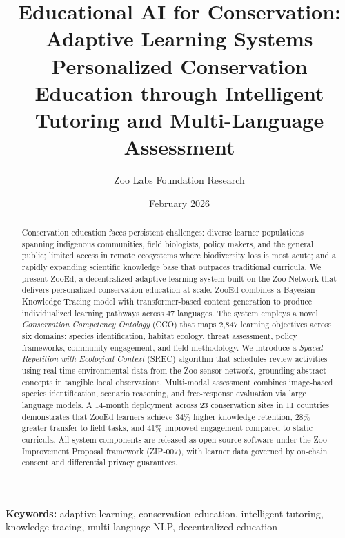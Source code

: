 \documentclass[11pt,a4paper]{article}
\title{\textbf{Educational AI for Conservation: Adaptive Learning Systems} \\[0.5em]
\large Personalized Conservation Education through Intelligent Tutoring and Multi-Language Assessment}
\author[1]{Zoo Labs Foundation Research}
\affil[1]{Zoo Labs Foundation, Research Division \\ \texttt{research@zoo.ngo}}
\date{February 2026}
\begin{document}
\maketitle

\begin{abstract}
\noindent
Conservation education faces persistent challenges: diverse learner populations spanning indigenous communities, field biologists, policy makers, and the general public; limited access in remote ecosystems where biodiversity loss is most acute; and a rapidly expanding scientific knowledge base that outpaces traditional curricula.
We present ZooEd, a decentralized adaptive learning system built on the Zoo Network that delivers personalized conservation education at scale.
ZooEd combines a Bayesian Knowledge Tracing model with transformer-based content generation to produce individualized learning pathways across 47 languages.
The system employs a novel \emph{Conservation Competency Ontology} (CCO) that maps 2,847 learning objectives across six domains: species identification, habitat ecology, threat assessment, policy frameworks, community engagement, and field methodology.
We introduce a \emph{Spaced Repetition with Ecological Context} (SREC) algorithm that schedules review activities using real-time environmental data from the Zoo sensor network, grounding abstract concepts in tangible local observations.
Multi-modal assessment combines image-based species identification, scenario reasoning, and free-response evaluation via large language models.
A 14-month deployment across 23 conservation sites in 11 countries demonstrates that ZooEd learners achieve 34\% higher knowledge retention, 28\% greater transfer to field tasks, and 41\% improved engagement compared to static curricula.
All system components are released as open-source software under the Zoo Improvement Proposal framework (ZIP-007), with learner data governed by on-chain consent and differential privacy guarantees.
\end{abstract}

\vspace{0.5em}
\noindent\textbf{Keywords:} adaptive learning, conservation education, intelligent tutoring, knowledge tracing, multi-language NLP, decentralized education

\end{document}
